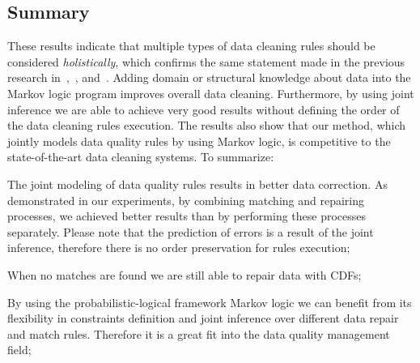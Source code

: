 \subsection{Summary}
These results indicate that multiple types of data cleaning rules should be considered \textit{holistically}, which confirms the same statement made in the previous research in~\cite{Dallachiesa:2013:NCD:2463676.2465327},~\cite{Fan:2014:IRM:2628135.2567657}, and~\cite{Fan:2011:IRM:1989323.1989373}. Adding domain or structural knowledge about data into the Markov logic program improves overall data cleaning. Furthermore, by using joint inference we are able to achieve very good results without defining the order of the data cleaning rules execution. The results also show that our method, which jointly models data quality rules by using Markov logic, is competitive to the state-of-the-art data cleaning systems. To summarize:
\begin{inparaenum}[\itshape 1\upshape)]    
    	\item The joint modeling of data quality rules results in better data correction. As demonstrated in our experiments, by combining matching and repairing processes, we achieved better results than by performing these processes separately. Please note that the prediction of errors is a result of the joint inference, therefore there is no order preservation for rules execution;
    	\item When no matches are found we are still able to repair data with CDFs; 
    	\item By using the probabilistic-logical framework Markov logic we can benefit from its flexibility in constraints definition and joint inference over different data repair and match rules. Therefore it is a great fit into the data quality management field;
\end{inparaenum}



